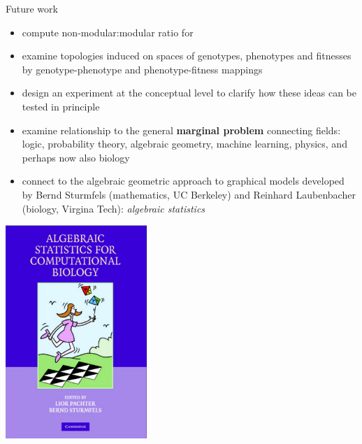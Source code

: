 \begin{frame}
\begin{footnotesize}
\begin{block}{Future work}
\begin{itemize}
\item compute non-modular:modular ratio for
\begin{enumerate}
\end{enumerate}
\item examine topologies induced on spaces of genotypes, phenotypes and fitnesses by genotype-phenotype and phenotype-fitness mappings
\item design an experiment at the conceptual level to clarify how these ideas can be tested in principle
\item examine relationship to the general \textbf{marginal problem} connecting fields: logic, probability theory, algebraic geometry, machine learning, physics, and perhaps now also biology
\item connect to the algebraic geometric approach to graphical models developed by Bernd Sturmfels (mathematics, UC Berkeley) and Reinhard Laubenbacher (biology, Virgina Tech): \emph{algebraic statistics}
\end{itemize}
\end{block}
\end{footnotesize}
\end{frame}

\begin{frame}
\vspace{3em}
\begin{center}
\includegraphics[width=0.4\textwidth]{fig/ASCB_Cover.jpg}
\end{center}
\end{frame}
